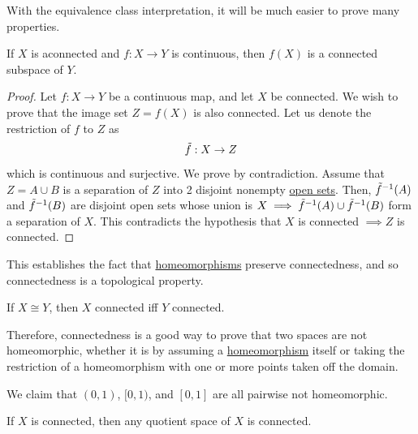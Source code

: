   With the equivalence class interpretation, it will be much easier to prove many properties. 

  \begin{theorem}
    \label{thm:continuous-images-of-connected-spaces-are}
    If $X$ is aconnected and $f: X \rightarrow Y$ is continuous, then $f(X)$ is a connected subspace of $Y$. 
  \end{theorem}
  \begin{proof}
    Let $f: X \to Y$ be a continuous map, and let $X$ be connected. We wish to prove that the image set $Z = f(X)$ is also connected. Let us denote the restriction of $f$ to $Z$ as
    \begin{equation}
      \Tilde{f}: X \to Z
    \end{equation}
    which is continuous and surjective. We prove by contradiction. Assume that $Z = A \cup B$ is a separation of $Z$ into 2 disjoint nonempty \hyperref[def:open-set]{open sets}. Then, $\Tilde{f}^{-1} (A)$ and $\Tilde{f}^{-1}(B)$ are disjoint open sets whose union is $X \implies \Tilde{f}^{-1} (A) \cup \Tilde{f}^{-1}(B)$ form a separation of $X$. This contradicts the hypothesis that $X$ is connected $\implies Z$ is connected.  
  \end{proof} 

  This establishes the fact that \hyperref[def:homeomorphism]{homeomorphisms} preserve connectedness, and so connectedness is a topological property.  

  \begin{corollary}
    \label{thm:connectedness-is-a-topological-property}
    If $X \cong Y$, then $X$ connected iff $Y$ connected. 
  \end{corollary}

  Therefore, connectedness is a good way to prove that two spaces are not homeomorphic, whether it is by assuming a \hyperref[def:homeomorphism]{homeomorphism} itself or taking the restriction of a homeomorphism with one or more points taken off the domain. 

  \begin{example}
    \label{ex:intervals-of-endpoints-0-and-1}
    We claim that $(0, 1)$, $[0, 1)$, and $[0, 1]$ are all pairwise not homeomorphic. 
  \end{example}

  \begin{corollary}
    \label{thm:quotient-spaces}
    If $X$ is connected, then any quotient space of $X$ is connected. 
  \end{corollary}


